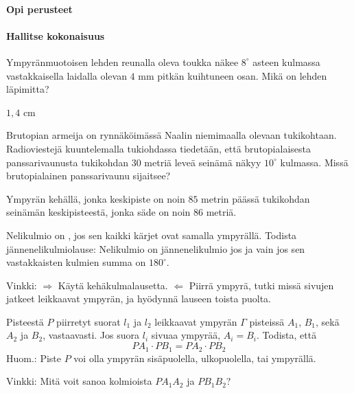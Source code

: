 \begin{tehtavasivu}

\paragraph*{Opi perusteet}

\paragraph*{Hallitse kokonaisuus}

\begin{tehtava}
Ympyränmuotoisen lehden reunalla oleva toukka näkee $8^\circ$ asteen kulmassa vastakkaisella 
laidalla olevan $4$ mm pitkän kuihtuneen osan. Mikä on lehden läpimitta?
\begin{vastaus}
$1,4$ cm
\end{vastaus}  
\end{tehtava}

\begin{tehtava}
Brutopian armeija on rynnäköimässä Naalin niemimaalla olevaan tukikohtaan. Radioviestejä kuuntelemalla tukiohdassa tiedetään, että brutopialaisesta panssarivaunusta tukikohdan $30$ metriä leveä seinämä näkyy $10^\circ$ kulmassa.
Missä brutopialainen panssarivaunu sijaitsee?
\begin{vastaus}
Ympyrän kehällä, jonka keskipiste on noin $85$ metrin päässä tukikohdan seinämän keskipisteestä, jonka säde on noin $86$ metriä.
\end{vastaus}
\end{tehtava}

\begin{tehtava}
Nelikulmio on , jos sen kaikki kärjet ovat samalla ympyrällä. Todista jännenelikulmiolause: Nelikulmio on jännenelikulmio jos ja vain jos sen vastakkaisten kulmien summa on $180^{\circ}$.
\begin{vastaus}
Vinkki: $\Rightarrow$ Käytä kehäkulmalausetta. $\Leftarrow$ Piirrä ympyrä, tutki missä sivujen jatkeet leikkaavat ympyrän, ja hyödynnä lauseen toista puolta.
\end{vastaus}
\end{tehtava}

\begin{tehtava}
Pisteestä $P$ piirretyt suorat $l_1$ ja $l_2$ leikkaavat ympyrän $\Gamma$ pisteissä $A_1$, $B_1$, sekä $A_2$ ja $B_2$, vastaavasti. Jos suora $l_{i}$ sivuaa ympyrää, $A_{i} = B_{i}$. Todista, että
\[
PA_{1}\cdot PB_{1} = PA_{2}\cdot PB_{2}
\]
Huom.: Piste $P$ voi olla ympyrän sisäpuolella, ulkopuolella, tai ympyrällä.
\begin{vastaus}
Vinkki: Mitä voit sanoa kolmioista $PA_1A_2$ ja $PB_1B_2$?
\end{vastaus}
\end{tehtava}

\end{tehtavasivu}
